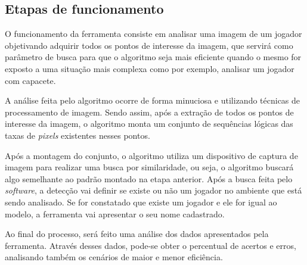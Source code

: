 \subsection{{Etapas de funcionamento}}

O funcionamento da ferramenta consiste em analisar uma imagem de um jogador objetivando adquirir todos os pontos de interesse da imagem, que servirá como parâmetro de busca para que o algoritmo seja mais eficiente quando o  mesmo for exposto a uma situação mais complexa como por exemplo, analisar um jogador com capacete.

A análise feita pelo algoritmo ocorre de forma minuciosa e utilizando técnicas de processamento de imagem. Sendo assim, após a extração de todos os pontos de interesse da imagem, o algoritmo monta um conjunto de sequências lógicas das taxas de \textit{pixels} existentes nesses pontos.

Após a montagem do conjunto, o algoritmo utiliza um dispositivo de captura de imagem para realizar uma busca por similaridade, ou seja, o algoritmo buscará algo semelhante ao padrão montado na etapa anterior. Após a busca feita pelo \textit{software}, a detecção vai definir se existe ou não um jogador no ambiente que está sendo analisado. Se for constatado que existe um jogador e ele for igual ao modelo, a ferramenta vai apresentar o seu nome cadastrado. 

Ao final do processo, será feito uma análise dos dados apresentados pela ferramenta. Através desses dados, pode-se obter o percentual de acertos e erros, analisando também os cenários de maior e menor eficiência.